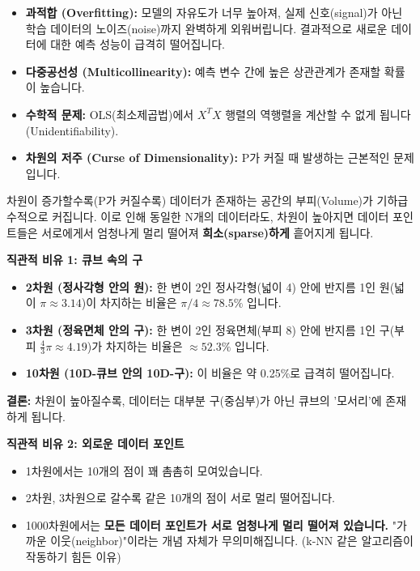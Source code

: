 \documentclass[11pt,a4paper]{book}
\theoremstyle{definition}
\begin{document}
\begin{itemize}
    \item \textbf{과적합 (Overfitting):} 모델의 자유도가 너무 높아져, 실제 신호(signal)가 아닌 학습 데이터의 노이즈(noise)까지 완벽하게 외워버립니다. 결과적으로 새로운 데이터에 대한 예측 성능이 급격히 떨어집니다.
    \item \textbf{다중공선성 (Multicollinearity):} 예측 변수 간에 높은 상관관계가 존재할 확률이 높습니다.
    \item \textbf{수학적 문제:} OLS(최소제곱법)에서 $X^T X$ 행렬의 역행렬을 계산할 수 없게 됩니다 (Unidentifiability).
    \item \textbf{차원의 저주 (Curse of Dimensionality):} P가 커질 때 발생하는 근본적인 문제입니다.
\end{itemize}

\begin{warningbox}[title={차원의 저주(Curse of Dimensionality)란?}]
차원이 증가할수록(P가 커질수록) 데이터가 존재하는 공간의 부피(Volume)가 기하급수적으로 커집니다.
이로 인해 동일한 N개의 데이터라도, 차원이 높아지면 데이터 포인트들은 서로에게서 엄청나게 멀리 떨어져 \textbf{희소(sparse)하게} 흩어지게 됩니다.

\textbf{직관적 비유 1: 큐브 속의 구}
\begin{itemize}
    \item \textbf{2차원 (정사각형 안의 원):} 한 변이 2인 정사각형(넓이 4) 안에 반지름 1인 원(넓이 $\pi \approx 3.14$)이 차지하는 비율은 $\pi/4 \approx 78.5\%$ 입니다.
    \item \textbf{3차원 (정육면체 안의 구):} 한 변이 2인 정육면체(부피 8) 안에 반지름 1인 구(부피 $\frac{4}{3}\pi \approx 4.19$)가 차지하는 비율은 $\approx 52.3\%$ 입니다.
    \item \textbf{10차원 (10D-큐브 안의 10D-구):} 이 비율은 약 0.25\%로 급격히 떨어집니다.
\end{itemize}
\textbf{결론:} 차원이 높아질수록, 데이터는 대부분 구(중심부)가 아닌 큐브의 '모서리'에 존재하게 됩니다.

\textbf{직관적 비유 2: 외로운 데이터 포인트}
\begin{itemize}
    \item 1차원에서는 10개의 점이 꽤 촘촘히 모여있습니다.
    \item 2차원, 3차원으로 갈수록 같은 10개의 점이 서로 멀리 떨어집니다.
    \item 1000차원에서는 \textbf{모든 데이터 포인트가 서로 엄청나게 멀리 떨어져 있습니다.} "가까운 이웃(neighbor)"이라는 개념 자체가 무의미해집니다. (k-NN 같은 알고리즘이 작동하기 힘든 이유)
\end{itemize}
\end{warningbox}
\end{document}

